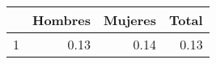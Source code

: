 \begin{table}[ht]
\centering
\begin{tabular}{rrrr}
  \hline
 & Hombres & Mujeres & Total \\ 
  \hline
1 & 0.13 & 0.14 & 0.13 \\ 
   \hline
\end{tabular}
\end{table}
